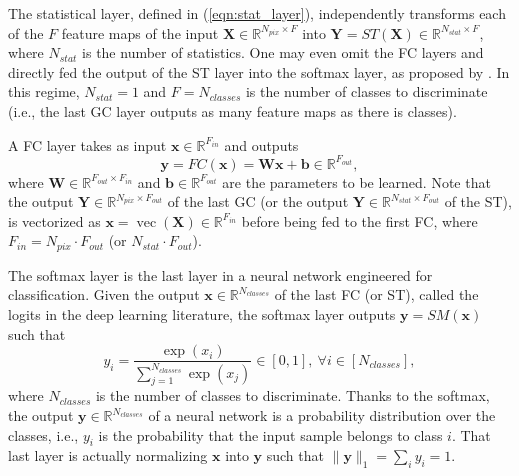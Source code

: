 \documentclass[final,twocolumn,3p,times,authoryear]{elsarticle}
\newcommand{\todo}[1]{{\color[rgb]{.6,.1,.6}{#1}}}
\newcommand{\eqnref}[1]{(\ref{eqn:#1})}
\renewcommand{\b}[1]{{\bm{#1}}}   %
\newcommand{\1}{\b{1}}              %
\newcommand{\0}{\b{0}}              %
\newcommand{\W}{\b{W}}
\newcommand{\x}{\b{x}}
\newcommand{\X}{\b{X}}
\newcommand{\y}{\b{y}}
\newcommand{\Y}{\b{Y}}
\newcommand{\R}{\mathbb{R}}
\DeclareMathOperator*{\vect}{vec}
\begin{document}
The statistical layer, defined in \eqnref{stat_layer}, independently transforms each of the $F$ feature maps of the input $\X \in \R^{N_{pix} \times F}$ into $\Y = ST(\X) \in \R^{N_{stat} \times F}$, where $N_{stat}$ is the number of statistics. One may even omit the FC layers and directly fed the output of the ST layer into the softmax layer, as proposed by \citet{lin2013globalavgpooling}. In this regime, $N_{stat} = 1$ and $F = N_{classes}$ is the number of classes to discriminate (i.e., the last GC layer outputs as many feature maps as there is classes).

A FC layer takes as input $\x \in \R^{F_{in}}$ and outputs
\begin{equation*}
	\y = FC(\x) = \b W \x + \b b \in \R^{F_{out}} ,
\end{equation*}
where $\W \in \R^{F_{out} \times F_{in}}$ and $\b b \in \R^{F_{out}}$ are the parameters to be learned.
Note that the output $\Y \in \R^{N_{pix} \times F_{out}}$ of the last GC (or the output $\Y \in \R^{N_{stat} \times F_{out}}$ of the ST), is vectorized as $\x = \vect(\X) \in \R^{F_{in}}$ before being fed to the first FC, where $F_{in} = N_{pix} \cdot F_{out}$ (or $N_{stat} \cdot F_{out}$).

The softmax layer is the last layer in a neural network engineered for classification. Given the output $\x \in \R^{N_{classes}}$ of the last FC (or ST), called the logits in the deep learning literature, the softmax layer outputs $\y = SM(\x)$ such that
\begin{equation*}
	y_i = \frac{\exp(x_i)}{\sum_{j=1}^{N_{classes}} \exp(x_j)} \in [0, 1], \ \forall i \in [N_{classes}],
\end{equation*}
where $N_{classes}$ is the number of classes to discriminate. Thanks to the softmax, the output $\y \in \R^{N_{classes}}$ of a neural network is a probability distribution over the classes, i.e., $y_i$ is the probability that the input sample belongs to class $i$. That last layer is actually normalizing $\x$ into $\y$ such that $\| \y \|_1 = \sum_i y_i = 1$.

\todo{Notation GC32 - P256 - FC10 to describe an architecture? Maybe more useful in Experiments where we describe the architecture used for each experiment.}
\end{document}
